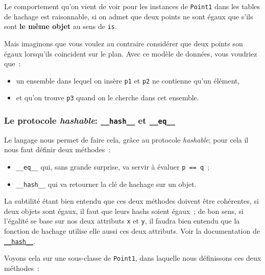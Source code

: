    Le comportement qu'on vient de voir pour les instances de
\texttt{Point1} dans les tables de hachage est raisonnable, si on admet
que deux points ne sont égaux que s'ils sont \textbf{le même objet} au
sens de \texttt{is}.

    Mais imaginons que vous voulez au contraire considérer que deux points
son égaux lorsqu'ils coincident sur le plan. Avec ce modèle de données,
vous voudriez que~:

\begin{itemize}
\tightlist
\item
  un ensemble dans lequel on insère \texttt{p1} et \texttt{p2} ne
  contienne qu'un élément,
\item
  et qu'on trouve \texttt{p3} quand on le cherche dans cet ensemble.
\end{itemize}

    \hypertarget{le-protocole-hashable-__hash__-et-__eq__}{%
\subsubsection{\texorpdfstring{Le protocole \emph{hashable}:
\texttt{\_\_hash\_\_} et
\texttt{\_\_eq\_\_}}{Le protocole hashable: \_\_hash\_\_ et \_\_eq\_\_}}\label{le-protocole-hashable-__hash__-et-__eq__}}

    Le langage nous permet de faire cela, grâce au protocole
\emph{hashable}; pour cela il nous faut définir deux méthodes~:

\begin{itemize}
\tightlist
\item
  \texttt{\_\_eq\_\_} qui, sans grande surprise, va servir à évaluer
  \texttt{p\ ==\ q}~;
\item
  \texttt{\_\_hash\_\_} qui va retourner la clé de hachage sur un objet.
\end{itemize}

La subtilité étant bien entendu que ces deux méthodes doivent être
cohérentes, si deux objets sont égaux, il faut que leurs hashs soient
égaux~; de bon sens, si l'égalité se base sur nos deux attributs
\texttt{x} et \texttt{y}, il faudra bien entendu que la fonction de
hachage utilise elle aussi ces deux attributs. Voir la documentation de
\href{https://docs.python.org/3/reference/datamodel.html?highlight=__hash__\#object.__hash__}{\texttt{\_\_hash\_\_}}.

    Voyons cela sur une sous-classe de \texttt{Point1}, dans laquelle nous
définissons ces deux méthodes~:

